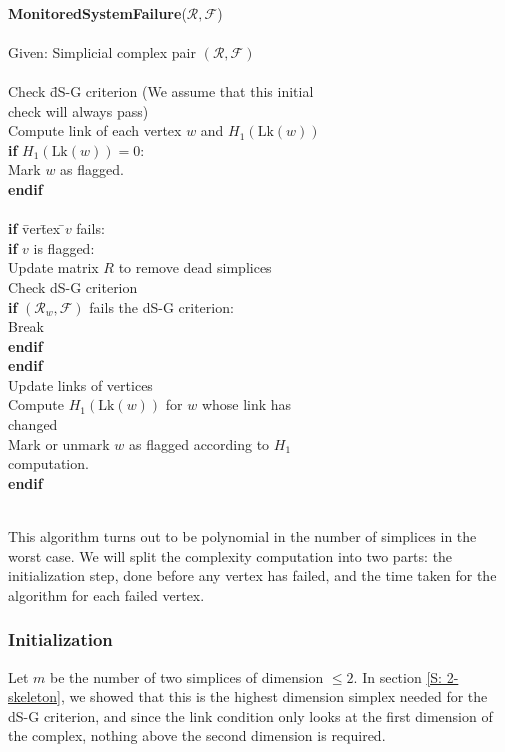 \documentclass[10pt,twocolumn]{article} \usepackage{amsmath,epsf,amssymb,cite,pifont,amsthm, mathrsfs,epsfig,  bbm, amsthm,  setspace}
\newcommand{\FF}{\mathcal F}
\newcommand{\RR}{\mathcal R}
\renewcommand{\1}{\mathbbm{1}}
\newcommand{\Lk}{\textrm{Lk}}
\newcommand{\RF}{\mathcal{R},\mathcal{F}}
\begin{document}
\begin{tabbing}
\\
\textbf{MonitoredSystemFailure}($\RF$)\\
\\
Given: Simplicial complex pair $(\RF)$\\
\\
Check \= dS-G criterion 
 (We assume that this initial \\ \>check will always pass)\\
Compute link of each vertex $w$ and $H_1(\Lk(w))$\\
\textbf{if} \={$H_1(\Lk(w)) = 0$}:\\
\>	Mark $w$ as flagged.\\
\textbf{endif}\\
\\
\textbf{if} \=ver\=tex \=$v$ fails:\\
\>		\textbf{if} {$v$ is flagged}:\\
\>\>			Update matrix $R$ to remove dead simplices\\
\>\>			Check dS-G criterion\\
\>\>			 \textbf{if} $(\RR_w,\FF)$ fails the dS-G criterion:\\
\>\>\>				 Break\\
\>\>			\textbf{endif} \\
\>		\textbf{endif} \\
\>		Update links of vertices\\
\>		Compute $H_1(\Lk(w))$ for $w$ whose link has \\ \>\>changed\\
\>		Mark or unmark $w$ as flagged according to $H_1$ \\ \>\>computation.\\
\textbf{endif} \\		
\\
\end{tabbing}


This algorithm turns out to be polynomial in the number of simplices in the worst case.
We will split the complexity computation into two parts: the initialization step, done before any vertex has failed, and the time taken for the algorithm for each failed vertex.

\subsubsection*{Initialization}

Let $m$ be the number of two simplices of dimension $\leq 2$.  In section \ref{S: 2-skeleton}, we showed that this is the highest dimension simplex needed for the dS-G criterion, and since the link condition only looks at the first dimension of the complex, nothing above the second dimension is required.
\end{document}
